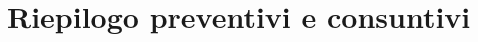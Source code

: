 \section{Riepilogo preventivi e consuntivi}

\begin{comment}
\subsection{Preventivo totale}
Per questa sezione per approfondimenti si rimanda al documento \emph{"Dichiarazione impegni v1.2"} citato nella sezione \ref{sec:rif_inf} \emph{"$\textit{Riferimenti}_G$ informativi"}.\\
Come riportato dal sopracitato documento, i costi orari per ogni membro in base al ruolo sono i seguenti:
\begin{table}[htbp]
    \centering    
    \begin{spreadtab}{{tabular}{|c|c|c|c|c|c|c|c|}}
    \hline
    @\textbf{Membro} & @\textbf{Re} & @\textbf{Amm} & @\textbf{An} & @\textbf{Progr} & @\textbf{Proge} & @\textbf{Ve} & @\textbf{Totale} \\
    \hline
    @ Samuele V.   & 12          & 9          & 15         & 25          & 16     & 16     & sum(b2:g2) \\
    @ Leonardo B.  & 12         & 9          & 15         & 25          & 16     & 16     & sum(b3:g3) \\
    @ Riccardo Z.  & 12          & 9          & 15          & 25          & 16     & 16     & sum(b4:g4) \\
    @ Davide B.    & 12          & 9          & 15       & 25          & 16     & 16     & sum(b5:g5) \\
    @ Michele Z.   & 12          & 9          & 15         & 25          & 16     & 16     & sum(b6:g6) \\
    @ Filippo T.   & 12          & 9          & 15          & 25         & 16     & 16     & sum(b7:g7) \\
    \hline
    @\textbf{Ore totali} & sum(b2:b7) & sum(c2:c7) & sum(d2:d7) & sum(e2:e7) & sum(f2:f7) & sum(g2:g7) &  sum(b8:g8)\\
    \hline
    @\textbf{Costo totale} & 30*b8 & 20*c8 & 25*d8 & 15*e8 & 25*f8 & 15*g8 & sum(b9:g9)\\
    \hline
    \end{spreadtab}
    \caption{Preventivo orario ed economico totale, in base al ruolo}
    \label{tab:prev_totale}
    \vspace{5mm}
    \textbf{Legenda:} \textit{Re} = Responsabile, \textit{Amm} = Amministratore, \textit{An} = Analista, \textit{Progr} = Programmatore, \textit{Proge} = Progettista, \textit{Ve} = Verificatore
\end{table}
\end{comment}

